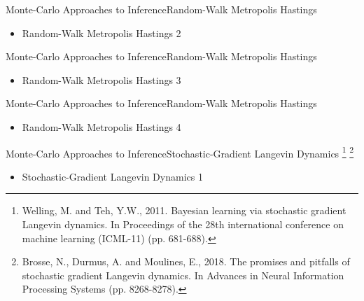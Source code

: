 \documentclass[AERbeamer%
              ,optEnglish%
              ,optBiber%
              ,optBibstyleAlphabetic%
              ,optBeamerClassicFormat%
              ]{AERlatex}%
\begin{document}
\begin{frame}[c]{Monte-Carlo Approaches to Inference}{Random-Walk Metropolis Hastings}
    \centering
    \begin{itemize}
        \item Random-Walk Metropolis Hastings 2
    \end{itemize}
\end{frame}


\begin{frame}[c]{Monte-Carlo Approaches to Inference}{Random-Walk Metropolis Hastings}
    \centering
    \begin{itemize}
        \item Random-Walk Metropolis Hastings 3
    \end{itemize}
\end{frame}


\begin{frame}[c]{Monte-Carlo Approaches to Inference}{Random-Walk Metropolis Hastings}
    \centering
    \begin{itemize}
        \item Random-Walk Metropolis Hastings 4
    \end{itemize}
\end{frame}



\begin{frame}[c]{Monte-Carlo Approaches to Inference}{Stochastic-Gradient Langevin Dynamics \footnote{Welling, M. and Teh, Y.W., 2011. Bayesian learning via stochastic gradient Langevin
                                                                                                      dynamics. In Proceedings of the 28th international conference on machine learning
                                                                                                      (ICML-11) (pp. 681-688).}
                                                                                            \footnote{Brosse, N., Durmus, A. and Moulines, E., 2018. The promises and pitfalls of stochastic
                                                                                                      gradient Langevin dynamics. In Advances in Neural Information Processing Systems (pp. 8268-8278).}}
    \centering
    \begin{itemize}
        \item Stochastic-Gradient Langevin Dynamics 1
    \end{itemize}
\end{frame}
\end{document}
